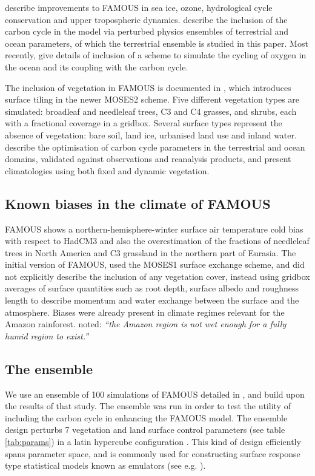 \documentclass[esd, article]{copernicus} %
\begin{document}
\cite{smith2012famous} describe improvements to FAMOUS in sea ice, ozone, hydrological cycle conservation and upper tropospheric dynamics. \cite{williams2013optimising} describe the inclusion of the carbon cycle in the model via perturbed physics ensembles of terrestrial and ocean parameters, of which the terrestrial ensemble is studied in this paper. Most recently, \cite{williams2014oxygen} give details of inclusion of a scheme to simulate the cycling of oxygen in the ocean and its coupling with the carbon cycle.

The inclusion of vegetation in FAMOUS is documented in \cite{williams2013optimising}, which introduces surface tiling in the newer MOSES2 scheme. Five different vegetation types are simulated: broadleaf and needleleaf trees, C3 and C4 grasses, and shrubs, each with a fractional coverage in a gridbox. Several surface types represent the absence of vegetation: bare soil, land ice, urbanised land use and inland water. \cite{williams2013optimising} describe the optimisation of carbon cycle parameters in the terrestrial and ocean domains, validated against observations and reanalysis products, and present climatologies using both fixed and dynamic vegetation.  

\subsection{Known biases in the climate of FAMOUS}\label{ssec:biases}

FAMOUS shows a northern-hemisphere-winter surface air temperature cold bias with respect to HadCM3 and also the overestimation of the fractions of needleleaf trees in North America and C3 grassland in the northern part of Eurasia. The initial version of FAMOUS, used the MOSES1 surface exchange scheme, and did not explicitly describe the inclusion of any vegetation cover, instead using gridbox averages of surface quantities such as root depth, surface albedo and roughness length to describe momentum and water exchange between the surface and the atmosphere. Biases were already present in climate regimes \citep{gnanadesikan2006diagnosing} relevant for the Amazon rainforest. \cite{smith2008famous} noted: \emph{``the Amazon region is not wet enough for a fully humid region to exist.''}

\subsection{The ensemble}
We use an ensemble of 100 simulations of FAMOUS detailed in \cite{williams2013optimising}, and build upon the results of that study. The ensemble was run in order to test the utility of including the carbon cycle in enhancing the FAMOUS model. The ensemble design perturbs 7 vegetation and land surface control parameters (see table \ref{tab:params}) in a latin hypercube configuration \citep{mckay1979comparison}. This kind of design efficiently spans parameter space, and is commonly used for constructing surface response type statistical models known as emulators (see e.g. \citep{urban2010comparison}).
\end{document}
